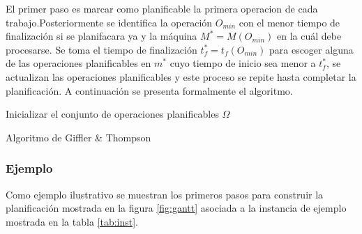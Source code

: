 El primer paso es marcar como planificable la primera operacion de cada trabajo.Posteriormente se identifica la operación $O_{min}$ con el menor tiempo de finalización si se planifacara ya y la máquina $M^*=M(O_{min})$ en la cuál debe procesarse. Se toma el tiempo de finalización $t^*_f = t_f(O_{min})$ para escoger alguna de las operaciones planificables en $m^*$ cuyo tiempo de inicio sea menor a $t^*_f$, se actualizan las operaciones planificables y este proceso se repite hasta completar la planificación. A continuación se presenta formalmente el algoritmo.\\ 


\begin{algorithm}[H]
 Inicializar el conjunto de operaciones planificables $\Omega$\;
    \label{alg:GT}
    \caption{Algoritmo de Giffler \& Thompson}
\end{algorithm}
\subsubsection*{Ejemplo}
Como ejemplo ilustrativo se muestran los primeros pasos para construir la planificación mostrada en la figura \ref{fig:gantt} asociada a la instancia de ejemplo mostrada en la tabla \ref{tab:inst}.\\

